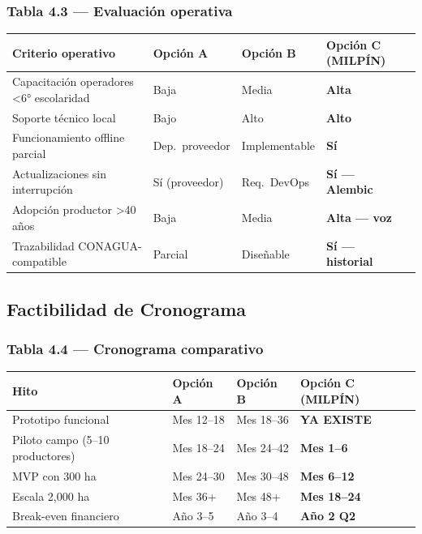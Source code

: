 \documentclass[12pt,letterpaper]{article}
\newcommand{\tH}[1]{\cellcolor{azulOscuro}\color{white}\bfseries\small #1}
\newcommand{\fA}{\rowcolor{azulFila}}
\newcommand{\cmark}{{\color{verdeOk}\bfseries\ding{51}}}
\begin{document}
\subsubsection*{Tabla 4.3 — Evaluación operativa}
\begin{tabularx}{\textwidth}{>{\small}X
    >{\small\centering\arraybackslash}p{2.6cm}
    >{\small\centering\arraybackslash}p{2.6cm}
    >{\small\centering\arraybackslash}p{3.2cm}}
\toprule
\tH{Criterio operativo} & \tH{Opción A} & \tH{Opción B} & \tH{Opción C (MILPÍN)} \\
\midrule
Capacitación operadores \textless{}6° escolaridad & Baja & Media & \textbf{Alta}~\cmark \\
\fA Soporte técnico local                          & Bajo & Alto  & \textbf{Alto}~\cmark \\
Funcionamiento offline parcial                     & Dep.\ proveedor & Implementable & \textbf{Sí}~\cmark \\
\fA Actualizaciones sin interrupción               & Sí (proveedor) & Req.\ DevOps & \textbf{Sí — Alembic}~\cmark \\
Adopción productor \textgreater{}40 años           & Baja & Media & \textbf{Alta — voz}~\cmark \\
\fA Trazabilidad CONAGUA-compatible                & Parcial & Diseñable & \textbf{Sí — historial}~\cmark \\
\bottomrule
\end{tabularx}

\subsection{Factibilidad de Cronograma}

\subsubsection*{Tabla 4.4 — Cronograma comparativo}
\begin{tabularx}{\textwidth}{>{\small}X
    >{\small\centering\arraybackslash}p{2.8cm}
    >{\small\centering\arraybackslash}p{2.8cm}
    >{\small\centering\arraybackslash}p{3.2cm}}
\toprule
\tH{Hito} & \tH{Opción A} & \tH{Opción B} & \tH{Opción C (MILPÍN)} \\
\midrule
Prototipo funcional                   & Mes 12–18 & Mes 18–36 & \textbf{YA EXISTE}~\cmark \\
\fA Piloto campo (5–10 productores)   & Mes 18–24 & Mes 24–42 & \textbf{Mes 1–6}~\cmark \\
MVP con 300 ha                        & Mes 24–30 & Mes 30–48 & \textbf{Mes 6–12}~\cmark \\
\fA Escala 2{,}000 ha                 & Mes 36+   & Mes 48+   & \textbf{Mes 18–24}~\cmark \\
Break-even financiero                 & Año 3–5   & Año 3–4   & \textbf{Año 2 Q2}~\cmark \\
\bottomrule
\end{tabularx}
\end{document}
